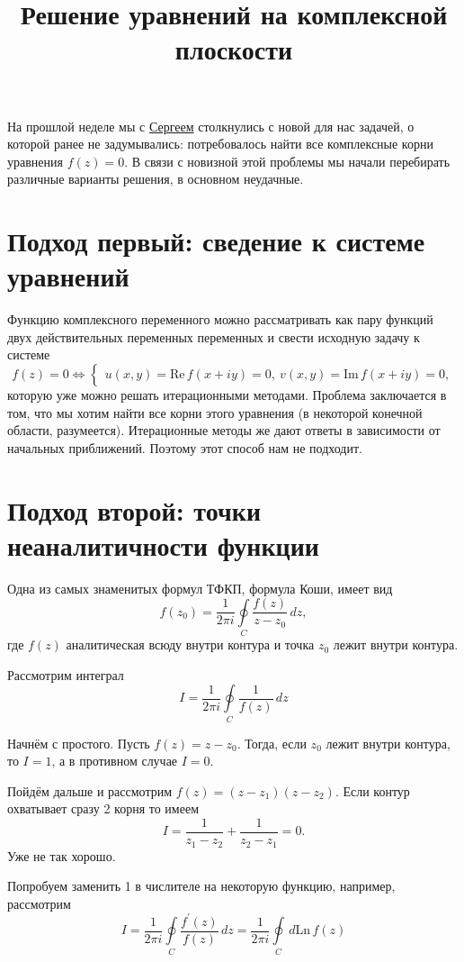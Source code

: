 \documentclass{ncc}
\title{Решение уравнений на комплексной плоскости}
\begin{document}
\maketitle
\tableofcontents
На прошлой неделе мы с \href{https://github.com/sputnikas}{Сергеем} столкнулись с новой для нас задачей, о которой ранее
не задумывались: потребовалось найти все комплексные корни уравнения \( f(z) =
0 \). В связи с новизной этой проблемы мы начали перебирать различные варианты
решения, в основном неудачные.


\section{Подход первый: сведение к системе уравнений}

Функцию комплексного переменного можно рассматривать как пару функций двух
действительных переменных переменных и свести исходную задачу к системе
\[
    f(z) = 0 \Leftrightarrow
    \begin{cases}
    u(x,y) = \mathrm{Re\,} f(x+iy) = 0,\
    v(x,y) = \mathrm{Im\,} f(x+iy) = 0,
    \end{cases}
\]
которую уже можно решать итерационными методами. Проблема заключается в том, что
мы хотим найти все корни этого уравнения (в некоторой конечной области,
разумеется). Итерационные методы же дают ответы в зависимости от начальных
приближений. Поэтому этот способ нам не подходит.

\section{Подход второй: точки неаналитичности функции}

Одна из самых знаменитых формул ТФКП, формула Коши, имеет вид
\[
    f(z_0) = \frac{1}{2\pi i}\oint\limits_{C} \frac{f(z)}{z-z_0}\,dz,
\]
где \(f(z)\) аналитическая всюду внутри контура и точка \(z_0\) лежит внутри
контура.

Рассмотрим интеграл
\[
    I = \frac{1}{2\pi i}\oint\limits_{C} \frac{1}{f(z)}\,dz
\]

Начнём с простого. Пусть \( f(z) = z - z_0 \). Тогда, если  \( z_0 \) лежит внутри контура, то \(I = 1\), а в противном случае \(I=0\).

Пойдём дальше и рассмотрим \(f(z) = (z-z_1)(z-z_2)\). Если контур охватывает сразу 2 корня то имеем
\[
I = \frac{1}{z_1 - z_2} + \frac{1}{z_2 - z_1} = 0.
\]
Уже не так хорошо.

Попробуем заменить 1  в числителе на некоторую функцию, например, рассмотрим
\[
    I = \frac{1}{2\pi i}\oint\limits_{C} \frac{f^\prime(z)}{f(z)}\,dz =
    \frac{1}{2\pi i}\oint\limits_{C}\, d \mathrm{Ln\,} f(z)
\]
\end{document}
